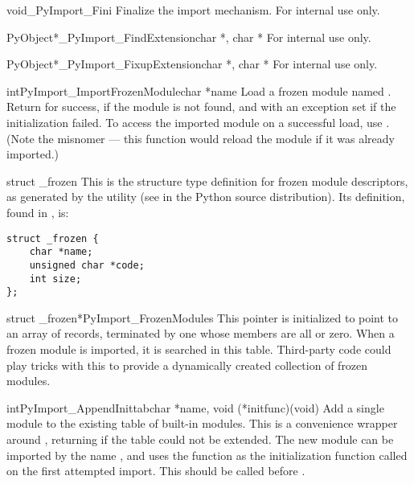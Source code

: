 \begin{cfuncdesc}{void}{_PyImport_Fini}{}
  Finalize the import mechanism.  For internal use only.
\end{cfuncdesc}

\begin{cfuncdesc}{PyObject*}{_PyImport_FindExtension}{char *, char *}
  For internal use only.
\end{cfuncdesc}

\begin{cfuncdesc}{PyObject*}{_PyImport_FixupExtension}{char *, char *}
  For internal use only.
\end{cfuncdesc}

\begin{cfuncdesc}{int}{PyImport_ImportFrozenModule}{char *name}
  Load a frozen module named .  Return  for success,
   if the module is not found, and  with an exception
  set if the initialization failed.  To access the imported module on
  a successful load, use .  (Note
  the misnomer --- this function would reload the module if it was
  already imported.)
\end{cfuncdesc}

\begin{ctypedesc}[_frozen]{struct _frozen}
  This is the structure type definition for frozen module descriptors,
  as generated by the  utility
  (see  in the Python source distribution).  Its
  definition, found in , is:

\begin{verbatim}
struct _frozen {
    char *name;
    unsigned char *code;
    int size;
};
\end{verbatim}
\end{ctypedesc}

\begin{cvardesc}{struct _frozen*}{PyImport_FrozenModules}
  This pointer is initialized to point to an array of  records, terminated by one whose members are all \NULL{} or
  zero.  When a frozen module is imported, it is searched in this
  table.  Third-party code could play tricks with this to provide a
  dynamically created collection of frozen modules.
\end{cvardesc}

\begin{cfuncdesc}{int}{PyImport_AppendInittab}{char *name,
                                               void (*initfunc)(void)}
  Add a single module to the existing table of built-in modules.  This
  is a convenience wrapper around
  , returning  if the
  table could not be extended.  The new module can be imported by the
  name , and uses the function  as the
  initialization function called on the first attempted import.  This
  should be called before .
\end{cfuncdesc}

